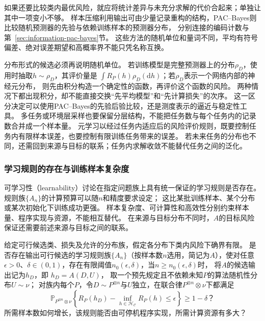 如果还要比较类内最优风险，就应将统计差异与未充分求解的代价合起来；单独让其中一项变小不够。
样本压缩利用输出可由少量记录重构的结构，PAC--Bayes则比较随机预测器的先验与依赖训练样本的预测器分布，
分别连接的编码计数与第~\ref{sec:information-pac-bayes}节。
这些方法的随机单位和量词不同，平均有符号偏差、绝对误差期望和高概率界不能只凭名称互换。

分布形式的候选必须再说明随机单位。
若训练模型是完整预测器上的分布$\rho_D$，使用时抽取$h\sim\rho_D$，其评价量是
$\int R_P(h)\rho_D(\mathrm dh)$；若$\rho_D$表示一个网络内部的神经元分布，
则先由积分构造一个确定性的函数，再评价这个函数的风险。
两种情况下都出现积分，却不能直接交换“先平均模型”和“先计算损失”的次序。
这一区分决定可以使用PAC--Bayes的先验后验比较，还是测度表示的逼近与稳定性工具。
多任务或环境层采样也要保留分层结构，不能把任务数与每个任务内的记录数合并成一个样本量。
元学习以经过任务内适应后的风险评价规则，既要控制任务内有限样本误差，也要控制有限训练任务带来的误差。
若未来任务的分布也不同，还需回到来源与目标的联系；任务内求解收敛不能替代任务之间的泛化。

\subsubsection{学习规则的存在与训练样本复杂度}
\label{sec:future-analysis-learnability}

可学习性（learnability）讨论在指定问题族上具有统一保证的学习规则是否存在。
规则族$\{A_n\}$的计算预算可以随$n$和精度要求设定；
这比某批训练样本、某个分布或某次初始化下训练成功更强。
样本复杂度、可计算性和高效性分别约束样本量、程序实现与资源，不能相互替代。
在来源与目标分布不同时，$A$的目标风险保证还需要前述来源与目标之间的联系。

\begin{mathproblem}[具有统一保证的学习规则是否存在]
  \label{question:future-learnability}
  给定可行候选类、损失及允许的分布族，假定各分布下类内风险下确界有限。
  是否存在输出可行候选的学习规则族$\{A_n\}$（按样本数$n$选用，简记为$A$），使对任意
  $\epsilon>0$、$\delta\in(0,1)$，存在有限阈值$n_0(\epsilon,\delta)$，当$n\geq n_0(\epsilon,\delta)$时，
  将$A$的候选输出记为$h_D$，即
  $h_D=A(D,U)$，
  取一个预先规定且不依赖未知$P$的算法随机性分布$U\sim\nu$；
  对族内每个$P$，令$D\sim P^{\otimes n}$与$U$独立，在联合律$P^{\otimes n}\otimes\nu$下都满足
  \[
    \mathbb P_{P^{\otimes n}\otimes\nu}\!\left\{
      R_P(h_D)-\inf_{h\in\mathcal H_{\mathcal C}}R_P(h)
      \leq\epsilon
    \right\}\geq1-\delta\text{？}
  \]
  所需样本数如何增长，该规则能否由可停机程序实现，所需计算资源有多大？
\end{mathproblem}

